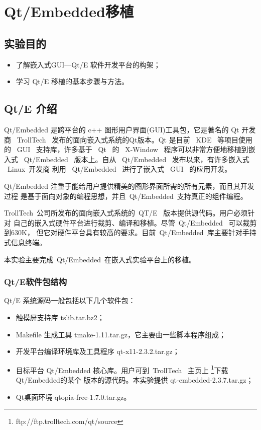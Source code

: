 \chapter{Qt/Embedded移植}

\section{实验目的}
\begin{itemize}\itemsep=-3pt
  \item 了解嵌入式GUI---Qt/E 软件开发平台的构架；
  \item 学习 Qt/E 移植的基本步骤与方法。
\end{itemize}

\section{Qt/E 介绍}
	Qt/Embedded 是跨平台的 c++ 图形用户界面(GUI)工具包，它是著名的 Qt 开发商
~TrollTech~ 发布的面向嵌入式系统的Qt版本。Qt 是目前 ~KDE~ 等项目使用的 ~GUI~
支持库，许多基于 ~Qt~ 的 ~X-Window~ 程序可以非常方便地移植到嵌入式
~Qt/Embedded~ 版本上。自从 ~Qt/Embedded~ 发布以来，有许多嵌入式 ~Linux~开发商
利用 ~Qt/Embedded~ 进行了嵌入式 ~GUI~ 的应用开发。

	Qt/Embedded 注重于能给用户提供精美的图形界面所需的所有元素，而且其开发过程
是基于面向对象的编程思想，并且~Qt/Embedded~支持真正的组件编程。

	TrollTech~公司所发布的面向嵌入式系统的~QT/E~ 版本提供源代码。用户必须针对
自己的嵌入式硬件平台进行裁剪、编译和移植。尽管~Qt/Embedded~ 可以裁剪到630K，
但它对硬件平台具有较高的要求。目前~Qt/Embedded~库主要针对手持式信息终端。

	本实验主要完成~Qt/Embedded~在嵌入式实验平台上的移植。
\subsection{Qt/E软件包结构}
	Qt/E 系统源码一般包括以下几个软件包：
\begin{itemize}\itemsep=-3pt
  \item 触摸屏支持库 tslib.tar.bz2；
  \item Makefile 生成工具 tmake-1.11.tar.gz，它主要由一些脚本程序组成；
  \item 开发平台编译环境库及工具程序 qt-x11-2.3.2.tar.gz；
  \item 目标平台 Qt/Embedded 核心库。用户可到~TrollTech~ 主页上
		\footnote{ftp://ftp.trolltech.com/qt/source}下载Qt/Embedded的某个
		版本的源代码。本实验提供 qt-embedded-2.3.7.tar.gz；
  \item Qt桌面环境 qtopia-free-1.7.0.tar.gz。
\end{itemize}

